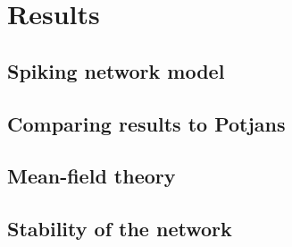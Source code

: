 \section{Results}
\label{sec:results}

\subsection{Spiking network model}

\subsection{Comparing results to Potjans}

\subsection{Mean-field theory}

\subsection{Stability of the network}
